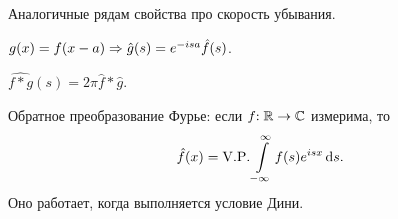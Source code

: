 \documentclass{notes}
\begin{document}
	\begin{pr}
		Аналогичные рядам свойства про скорость убывания.
	\end{pr}

	\begin{pr}
		$g(x) = f(x - a) \Rightarrow \hat{g}(s) = e^{-isa} \hat{f}(s)$.
	\end{pr}

	\begin{pr}
		$\hat{f * g}(s) = 2 \pi \hat{f} * \hat{g}$.
	\end{pr}

	\begin{pr}
		Обратное преобразование Фурье: если $f \text{\text{:}} \; \mathbb{R} \to \mathbb{C}$ измерима, то
		\[
			\hat{f}(x) = \mathrm{V. P.} \int\limits_{-\infty}^{\infty} f(s)e^{isx} \, \mathrm{d} s.
		\]
		Оно работает, когда выполняется условие Дини.
	\end{pr}


	
\end{document}
